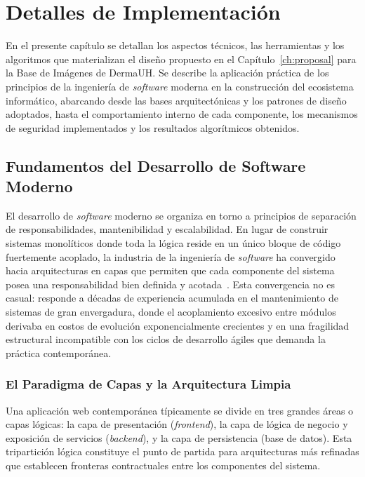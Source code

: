 \chapter{Detalles de Implementación}\label{ch:implementation}

En el presente capítulo se detallan los aspectos técnicos, las herramientas y los algoritmos que materializan 
el diseño propuesto en el Capítulo~\ref{ch:proposal} para la Base de Imágenes de DermaUH. Se describe la 
aplicación práctica de los principios de la ingeniería de \textit{software} moderna en la construcción del 
ecosistema informático, abarcando desde las bases arquitectónicas y los patrones de diseño adoptados, hasta 
el comportamiento interno de cada componente, los mecanismos de seguridad implementados y los resultados 
algorítmicos obtenidos.

\section{Fundamentos del Desarrollo de Software Moderno}
El desarrollo de \textit{software} moderno se organiza en torno a principios de separación de 
responsabilidades, mantenibilidad y escalabilidad. En lugar de construir sistemas monolíticos donde toda 
la lógica reside en un único bloque de código fuertemente acoplado, la industria de la ingeniería 
de \textit{software} ha convergido hacia arquitecturas en capas que permiten que cada componente del 
sistema posea una responsabilidad bien definida y acotada~\cite{martin_clean_architecture}. Esta 
convergencia no es casual: responde a décadas de experiencia acumulada en el mantenimiento de sistemas 
de gran envergadura, donde el acoplamiento excesivo entre módulos derivaba en costos de evolución 
exponencialmente crecientes y en una fragilidad estructural incompatible con los ciclos de desarrollo 
ágiles que demanda la práctica contemporánea.

\subsection{El Paradigma de Capas y la Arquitectura Limpia}
Una aplicación web contemporánea típicamente se divide en tres grandes áreas o capas lógicas: la capa de 
presentación (\textit{frontend}), la capa de lógica de negocio y exposición de servicios 
(\textit{backend}), y la capa de persistencia (base de datos). Esta tripartición lógica constituye el 
punto de partida para arquitecturas más refinadas que establecen fronteras contractuales entre 
los componentes del sistema.

